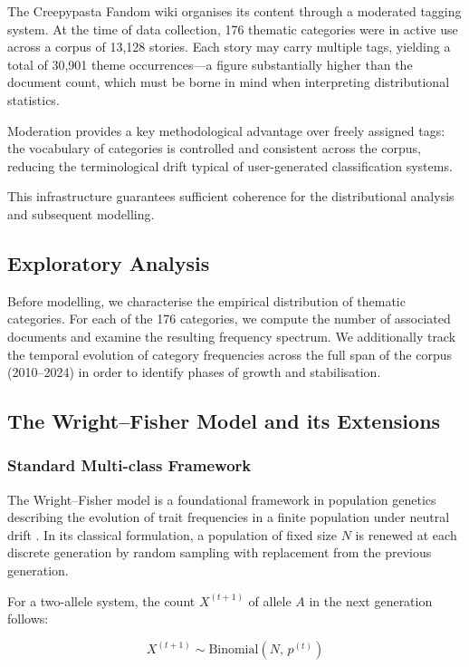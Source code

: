 \documentclass{anthology-ch}         %
\begin{document}
The Creepypasta Fandom wiki organises its content through a moderated tagging system. At the time of data collection, 176 thematic categories were in active use across a corpus of 13,128 stories. Each story may carry multiple tags, yielding a total of 30,901 theme occurrences---a figure substantially higher than the document count, which must be borne in mind when interpreting distributional statistics.

Moderation provides a key methodological advantage over freely assigned tags: the vocabulary of categories is controlled and consistent across the corpus, reducing the terminological drift typical of user-generated classification systems.

This infrastructure guarantees sufficient coherence for the distributional analysis and subsequent modelling.

\subsection{Exploratory Analysis}

Before modelling, we characterise the empirical distribution of thematic categories. For each of the 176 categories, we compute the number of associated documents and examine the resulting frequency spectrum. We additionally track the temporal evolution of category frequencies across the full span of the corpus (2010--2024) in order to identify phases of growth and stabilisation.

\subsection{The Wright--Fisher Model and its Extensions}

\subsubsection{Standard Multi-class Framework}

The Wright--Fisher model is a foundational framework in population genetics describing the evolution of trait frequencies in a finite population under neutral drift \cite{fisher1999genetical, wright1931evolution}. In its classical formulation, a population of fixed size $N$ is renewed at each discrete generation by random sampling with replacement from the previous generation.

For a two-allele system, the count $X^{(t+1)}$ of allele $A$ in the next generation follows:

\begin{equation}
X^{(t+1)} \sim \text{Binomial}\!\left(N,\, p^{(t)}\right)
\end{equation}
\end{document}
